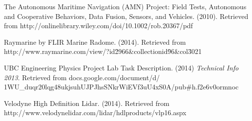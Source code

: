 \begin{thebibliography}{999}


 The Autonomous Maritime Navigation (AMN) Project:
Field Tests, Autonomous and Cooperative Behaviors,
Data Fusion, Sensors, and Vehicles. (2010). Retrieved from http://onlinelibrary.wiley.com/doi/10.1002/rob.20367/pdf

 Raymarine by FLIR Marine Radome. (2014). Retrieved from http://www.raymarine.com/view/?id\=2966\&collectionid\=96\&col\=3021

 UBC Engineering Physics Project Lab Task Description. (2014) \textit{Technical Info 2013}. Retrieved from docs.google.com/document/d/\\1WU\_duqr20lqg48ukjsuhUJPJhsSNkrWiEVf3uU4xS0A/pub\#h.f2e6v0ormnoc

 Velodyne High Definition Lidar. (2014). Retrieved from http://www.velodynelidar.com/lidar/hdlproducts/vlp16.aspx

\end{thebibliography}